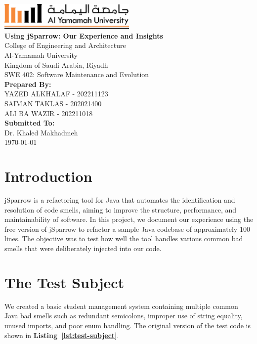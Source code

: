 \documentclass[a4paper,12pt]{article}
\def\maketitle{
  \begin{titlepage}
    \centering
    \vspace*{-1cm}
    \includegraphics[width=0.5\textwidth]{yu-logo.png}\\[2cm]
    {\huge\bfseries Using jSparrow: Our Experience and Insights}\\[2cm]
    {\Large College of Engineering and Architecture}\\
    {Al-Yamamah University}\\
    {Kingdom of Saudi Arabia, Riyadh}\\[1cm]
    SWE 402: Software Maintenance and Evolution\\[2cm]
    {\large\bfseries Prepared By:}\\[0.3cm]
    YAZED ALKHALAF - 202211123\\
    SAIMAN TAKLAS - 202021400\\
    ALI BA WAZIR  - 202211018\\
    [2cm]
    {\large\bfseries Submitted To:}\\[0.3cm]
    Dr. Khaled Makhadmeh\\[2cm]
    {\large \today}
    \vfill
  \end{titlepage}
}
\begin{document}
\maketitle

\section{Introduction}

jSparrow is a refactoring tool for Java that automates the identification and resolution of code smells, aiming to improve the structure, performance, and maintainability of software. In this project, we document our experience using the free version of jSparrow to refactor a sample Java codebase of approximately 100 lines. The objective was to test how well the tool handles various common bad smells that were deliberately injected into our code.

\section{The Test Subject}

We created a basic student management system containing multiple common Java bad smells such as redundant semicolons, improper use of string equality, unused imports, and poor enum handling. The original version of the test code is shown in \textbf{Listing~\ref{lst:test-subject}}.
\end{document}
